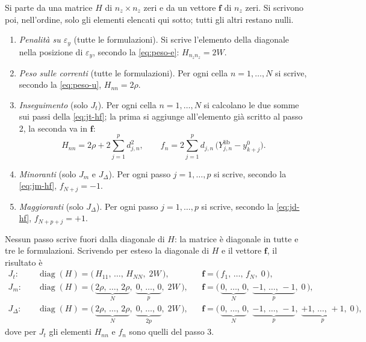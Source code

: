 \documentclass[11pt,a4paper]{article}
\newcommand{\vett}[1]{\boldsymbol{#1}}      %
\newcommand{\lib}{\mathrm{lib}}             %
\begin{document}
Si parte da una matrice $H$ di $n_z \times n_z$ zeri e da un vettore $\vett{f}$ di
$n_z$ zeri. Si scrivono poi, nell'ordine, solo gli elementi elencati qui sotto;
tutti gli altri restano nulli.
\begin{enumerate}
  \item \emph{Penalità su $\varepsilon_y$} (tutte le formulazioni). Si scrive l'elemento
        della diagonale nella posizione di $\varepsilon_y$, secondo la \eqref{eq:peso-e}:
        \mbox{$H_{n_z n_z} = 2W$}.
  \item \emph{Peso sulle correnti} (tutte le formulazioni). Per ogni cella
        $n = 1,\dots,N$ si scrive, secondo la \eqref{eq:peso-u},
        \mbox{$H_{nn} = 2\rho$}.
  \item \emph{Inseguimento} (solo $J_t$). Per ogni cella $n = 1,\dots,N$ si
        calcolano le due somme sui passi della \eqref{eq:jt-hf}; la prima si
        aggiunge all'elemento già scritto al passo 2, la seconda va in $\vett{f}$:
        \[
          H_{nn} = 2\rho + 2\sum_{j=1}^{p} d_{j,n}^2 , \qquad
          f_n = 2\sum_{j=1}^{p} d_{j,n}\,\bigl(Y^\lib_{j,n} - y^0_{k+j}\bigr) .
        \]
  \item \emph{Minoranti} (solo $J_m$ e $J_\Delta$). Per ogni passo
        $j = 1,\dots,p$ si scrive, secondo la \eqref{eq:jm-hf},
        \mbox{$f_{N+j} = -1$}.
  \item \emph{Maggioranti} (solo $J_\Delta$). Per ogni passo $j = 1,\dots,p$
        si scrive, secondo la \eqref{eq:jd-hf}, \mbox{$f_{N+p+j} = +1$}.
\end{enumerate}
Nessun passo scrive fuori dalla diagonale di $H$: la matrice è diagonale in
tutte e tre le formulazioni. Scrivendo per esteso la diagonale di $H$ e il
vettore $\vett{f}$, il risultato è
\begin{align*}
  J_t: \quad
    & \operatorname{diag}(H) = \bigl(\, H_{11},\, \dots,\, H_{NN},\; 2W \,\bigr) ,
    && \vett{f} = \bigl(\, f_1,\, \dots,\, f_N,\; 0 \,\bigr) , \\[6pt]
  J_m: \quad
    & \operatorname{diag}(H) = \bigl(\, \underbrace{2\rho,\, \dots,\, 2\rho}_{N},\;
        \underbrace{0,\, \dots,\, 0}_{p},\; 2W \,\bigr) ,
    && \vett{f} = \bigl(\, \underbrace{0,\, \dots,\, 0}_{N},\;
        \underbrace{-1,\, \dots,\, -1}_{p},\; 0 \,\bigr) , \\[6pt]
  J_\Delta: \quad
    & \operatorname{diag}(H) = \bigl(\, \underbrace{2\rho,\, \dots,\, 2\rho}_{N},\;
        \underbrace{0,\, \dots,\, 0}_{2p},\; 2W \,\bigr) ,
    && \vett{f} = \bigl(\, \underbrace{0,\, \dots,\, 0}_{N},\;
        \underbrace{-1,\, \dots,\, -1}_{p},\;
        \underbrace{+1,\, \dots,\, +1}_{p},\; 0 \,\bigr) ,
\end{align*}
dove per $J_t$ gli elementi $H_{nn}$ e $f_n$ sono quelli del passo 3.
\end{document}
